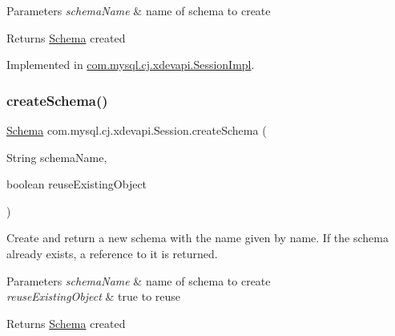 \begin{DoxyParams}{Parameters}
{\em schema\+Name} & name of schema to create \\
\hline
\end{DoxyParams}
\begin{DoxyReturn}{Returns}
\mbox{\hyperlink{interfacecom_1_1mysql_1_1cj_1_1xdevapi_1_1_schema}{Schema}} created 
\end{DoxyReturn}


Implemented in \mbox{\hyperlink{classcom_1_1mysql_1_1cj_1_1xdevapi_1_1_session_impl_a21dd320f0e162d26784465aa6bb859ce}{com.\+mysql.\+cj.\+xdevapi.\+Session\+Impl}}.

\mbox{\label{interfacecom_1_1mysql_1_1cj_1_1xdevapi_1_1_session_aef9311823fd5a36cba753a953f3613d3}} 
\subsubsection{\texorpdfstring{create\+Schema()}{createSchema()}\hspace{0.1cm}{\footnotesize\ttfamily [2/2]}}
{\footnotesize\ttfamily \mbox{\hyperlink{interfacecom_1_1mysql_1_1cj_1_1xdevapi_1_1_schema}{Schema}} com.\+mysql.\+cj.\+xdevapi.\+Session.\+create\+Schema (\begin{DoxyParamCaption}\item[{String}]{schema\+Name,  }\item[{boolean}]{reuse\+Existing\+Object }\end{DoxyParamCaption})}

Create and return a new schema with the name given by name. If the schema already exists, a reference to it is returned.


\begin{DoxyParams}{Parameters}
{\em schema\+Name} & name of schema to create \\
\hline
{\em reuse\+Existing\+Object} & true to reuse \\
\hline
\end{DoxyParams}
\begin{DoxyReturn}{Returns}
\mbox{\hyperlink{interfacecom_1_1mysql_1_1cj_1_1xdevapi_1_1_schema}{Schema}} created 
\end{DoxyReturn}


